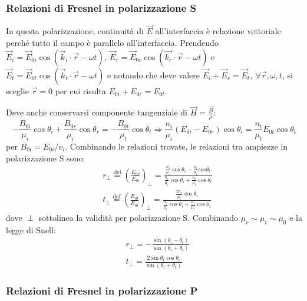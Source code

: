 \documentclass[a4paper]{scrartcl}
\numberwithin{equation}{subsection}
\theoremstyle{style1}
\begin{document}
\subsubsection{Relazioni di Fresnel in polarizzazione S}
In questa polarizzazione, continuit\`a di $\vec{E}$ all'interfaccia \`e relazione vettoriale perch\'e tutto il campo \`e parallelo all'interfaccia. Prendendo $\vec{E}_i = \vec{E}_{0i} \cos(\vec{k}_i \cdot \vec{r}-\omega t),\ \vec{E}_r = \vec{E}_{0r} \cos(\vec{k_r} \cdot \vec{r}-\omega t) $ e $\vec{E}_t = \vec{E}_{0t} \cos(\vec{k}_t \cdot \vec{r}-\omega t) $ e notando che deve valere $\vec{E}_i +\vec{E}_r = \vec{E}_t, \ \forall \vec{r}, \omega, t$, si sceglie $\vec{r}=0$ per cui risulta $E_{0i} + E_{0r} = E_{0t}  $.

Deve anche conservarsi componente tangenziale di $\vec{H}= \frac{\vec{B}}{\mu }$:
\[
- \frac{B_{0 i} }{\mu _i} \cos \theta _i + \frac{B_{0r} }{\mu _i}\cos \theta _r = - \frac{B_{0t} }{\mu _t}\cos \theta _t\Rightarrow \frac{n_i}{\mu _i} (E_{0i} - E_{0r} ) \cos \theta _i = \frac{n_t}{\mu _t} E_{0t} \cos \theta _t 
\] 
per $B_{0i} = E_{0i} / v_i$. Combinando le relazioni trovate, le relazioni tra ampiezze in polarizzazione S sono:
\begin{equation}
	\begin{split}
		&r_\perp \overset{\text{def}}{=} \left(\frac{E_{0r} }{E_{0i} }\right)_\perp = \frac{\frac{n_i}{\mu _i}\cos \theta _i - \frac{n_t}{\mu _t}cos \theta _t}{\frac{n_i}{\mu _i}\cos \theta _i + \frac{n_t}{\mu _t}\cos \theta _t}\\
		&t_\perp \overset{\text{def}}{=}\left(\frac{E_{0t} }{E_{0i} }\right) _\perp = \frac{ \frac{2n_i}{\mu _i}\cos \theta _i}{\frac{n_i}{\mu _i}\cos \theta _i + \frac{n_t}{\mu _t}\cos \theta _t}
	\end{split}
\end{equation}
dove $\perp$ sottolinea la validit\`a per polarizzazione S. Combinando $\mu _r \sim \mu _t \sim \mu _0$ e la legge di Snell:
\begin{equation}
	\begin{split}
		&r_\perp = - \frac{\sin(\theta _i - \theta _t)}{\sin(\theta _i + \theta _t)}\\
		&t_\perp = \frac{2 \sin \theta _t \cos \theta _i}{\sin (\theta _i + \theta _t)}
	\end{split}
\end{equation}
\subsubsection{Relazioni di Fresnel in polarizzazione P}
\end{document}
